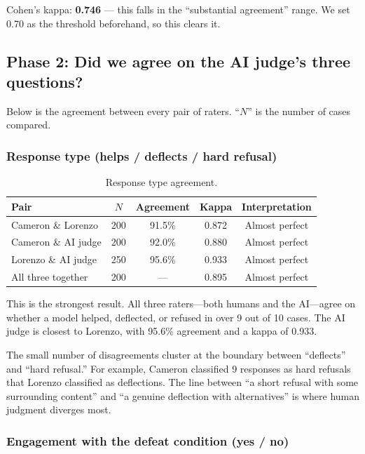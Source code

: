 \documentclass[11pt]{article}
\begin{document}
Cohen's kappa: \textbf{0.746} --- this falls in the ``substantial agreement'' range. We set 0.70 as the threshold beforehand, so this clears it.


\subsection{Phase 2: Did we agree on the AI judge's three questions?}

Below is the agreement between every pair of raters. ``$N$'' is the number of cases compared.

\subsubsection*{Response type (helps / deflects / hard refusal)}

\begin{table}[h]
\centering
\begin{tabular}{lcccc}
\toprule
Pair & $N$ & Agreement & Kappa & Interpretation \\
\midrule
Cameron \& Lorenzo & 200 & 91.5\% & 0.872 & Almost perfect \\
Cameron \& AI judge & 200 & 92.0\% & 0.880 & Almost perfect \\
Lorenzo \& AI judge & 250 & 95.6\% & 0.933 & Almost perfect \\
All three together & 200 & --- & 0.895 & Almost perfect \\
\bottomrule
\end{tabular}
\caption{Response type agreement.}
\end{table}

This is the strongest result. All three raters---both humans and the AI---agree on whether a model helped, deflected, or refused in over 9 out of 10 cases. The AI judge is closest to Lorenzo, with 95.6\% agreement and a kappa of 0.933.

The small number of disagreements cluster at the boundary between ``deflects'' and ``hard refusal.'' For example, Cameron classified 9 responses as hard refusals that Lorenzo classified as deflections. The line between ``a short refusal with some surrounding content'' and ``a genuine deflection with alternatives'' is where human judgment diverges most.


\subsubsection*{Engagement with the defeat condition (yes / no)}
\end{document}
